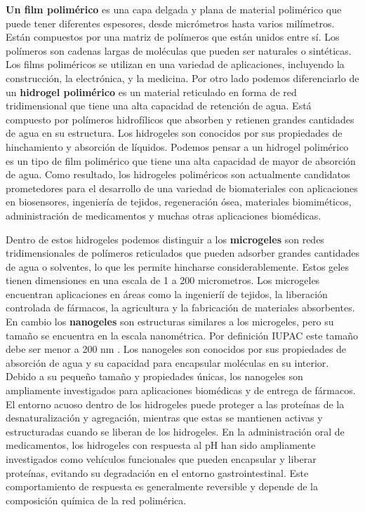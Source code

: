 
\textbf{Un film polim\'erico} es una capa delgada y plana de material polim\'erico que puede tener diferentes espesores, desde micr\'ometros hasta varios mil\'imetros. Est\'an compuestos por una matriz de pol\'imeros que est\'an unidos entre s\'i. Los pol\'imeros son cadenas largas de mol\'eculas que pueden ser naturales o sint\'eticas. Los films polim\'ericos se utilizan en una variedad de aplicaciones, incluyendo la construcci\'on, la electr\'onica, y la medicina.
Por otro lado podemos diferenciarlo de un \textbf{hidrogel polim\'erico} es un material reticulado en forma de red tridimensional que tiene una alta capacidad de retenci\'on de agua. Est\'a compuesto por pol\'imeros hidrof\'ilicos que absorben y retienen grandes cantidades de agua en su estructura. Los hidrogeles son conocidos por sus propiedades de hinchamiento y absorci\'on de l\'iquidos.
Podemos pensar a un hidrogel polim\'erico es un tipo de film polim\'erico que tiene una alta capacidad de mayor de absorci\'on de agua. Como resultado, los hidrogeles polim\'ericos son actualmente candidatos prometedores para el desarrollo de una variedad de biomateriales con aplicaciones en biosensores, ingenier\'ia de tejidos, regeneraci\'on \'osea, materiales biomim\'eticos, administraci\'on de medicamentos y muchas otras aplicaciones biom\'edicas. \cite{Daly2020}

Dentro de estos hidrogeles podemos distinguir a los \textbf{microgeles} son redes tridimensionales de pol\'imeros reticulados que pueden adsorber grandes cantidades de agua o solventes, lo que les permite hincharse considerablemente. Estos geles tienen dimensiones en una escala de 1 a 200 micrometros. Los microgeles encuentran aplicaciones en áreas como la ingenierí\'i de tejidos, la liberaci\'on controlada de f\'armacos, la agricultura y la fabricaci\'on de materiales absorbentes. \addcite
En cambio los  \textbf{nanogeles} son estructuras similares a los microgeles, pero su tama\~no se encuentra en la escala nanom\'etrica. Por definici\'on IUPAC este tama\~no debe ser menor a 200 nm \addcite. Los nanogeles son conocidos por sus propiedades de absorci\'on de agua y su capacidad para encapsular mol\'eculas en su interior. Debido a su peque\~no tama\~no y propiedades \'unicas, los nanogeles son ampliamente investigados para aplicaciones biom\'edicas y de entrega de f\'armacos.
El entorno acuoso dentro de los hidrogeles puede proteger a las prote\'inas de la desnaturalizaci\'on y agregaci\'on, mientras que estas se mantienen activas y estructuradas cuando se liberan de los hidrogeles. \addcite
En la administraci\'on oral de medicamentos, los hidrogeles con respuesta al pH han sido ampliamente investigados como veh\'iculos funcionales que pueden encapsular y liberar prote\'inas, evitando su degradaci\'on en el entorno gastrointestinal. \addcite
Este comportamiento de respuesta es  generalmente reversible y depende de la composici\'on qu\'imica de la red polim\'erica.


